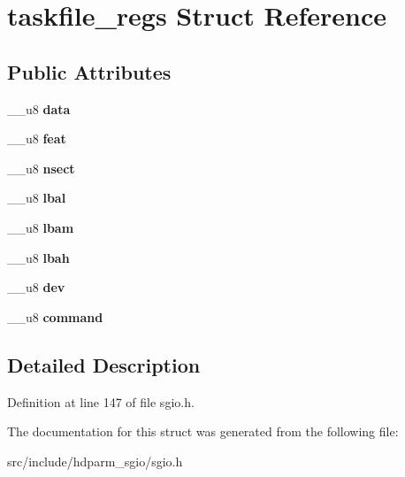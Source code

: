 \hypertarget{structtaskfile__regs}{}\section{taskfile\+\_\+regs Struct Reference}
\label{structtaskfile__regs}
\subsection*{Public Attributes}
\begin{DoxyCompactItemize}
\item 
\hypertarget{structtaskfile__regs_a451a4a9e1933f9260bf1ad50f5f006f8}{}\+\_\+\+\_\+u8 {\bfseries data}\label{structtaskfile__regs_a451a4a9e1933f9260bf1ad50f5f006f8}

\item 
\hypertarget{structtaskfile__regs_ab646356f7ee5f0ed009baa800a578e57}{}\+\_\+\+\_\+u8 {\bfseries feat}\label{structtaskfile__regs_ab646356f7ee5f0ed009baa800a578e57}

\item 
\hypertarget{structtaskfile__regs_ab0cb35ce9b43951e472f59be3983c6fe}{}\+\_\+\+\_\+u8 {\bfseries nsect}\label{structtaskfile__regs_ab0cb35ce9b43951e472f59be3983c6fe}

\item 
\hypertarget{structtaskfile__regs_a5f7a8cf7280b191070610f7de08a5698}{}\+\_\+\+\_\+u8 {\bfseries lbal}\label{structtaskfile__regs_a5f7a8cf7280b191070610f7de08a5698}

\item 
\hypertarget{structtaskfile__regs_a784e3f3a5d5da719e21f401785aa0126}{}\+\_\+\+\_\+u8 {\bfseries lbam}\label{structtaskfile__regs_a784e3f3a5d5da719e21f401785aa0126}

\item 
\hypertarget{structtaskfile__regs_a2d9d9f2afcca7544ddde290c077a07ed}{}\+\_\+\+\_\+u8 {\bfseries lbah}\label{structtaskfile__regs_a2d9d9f2afcca7544ddde290c077a07ed}

\item 
\hypertarget{structtaskfile__regs_ac02dda9a8eaa455a3a752efbe4ebbc15}{}\+\_\+\+\_\+u8 {\bfseries dev}\label{structtaskfile__regs_ac02dda9a8eaa455a3a752efbe4ebbc15}

\item 
\hypertarget{structtaskfile__regs_a3cc6fb39fe6f2ca2c8fdf694f8836981}{}\+\_\+\+\_\+u8 {\bfseries command}\label{structtaskfile__regs_a3cc6fb39fe6f2ca2c8fdf694f8836981}

\end{DoxyCompactItemize}


\subsection{Detailed Description}


Definition at line 147 of file sgio.\+h.



The documentation for this struct was generated from the following file\+:\begin{DoxyCompactItemize}
\item 
src/include/hdparm\+\_\+sgio/sgio.\+h\end{DoxyCompactItemize}
